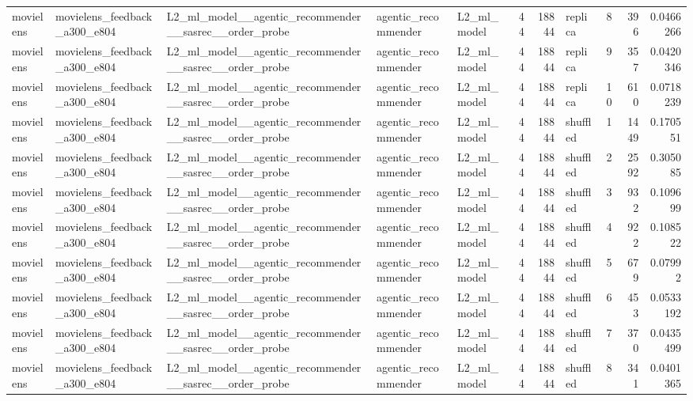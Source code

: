 \begin{table}[htbp!]
\begin{tabular}{lllllrrlrrr}
movielens & movielens\_feedback\_a300\_e804 & L2\_ml\_model\_\_agentic\_recommender\_\_sasrec\_\_order\_probe & agentic\_recommender & L2\_ml\_model & 44 & 18844 & replica & 8 & 396 & 0.0466266 \\
movielens & movielens\_feedback\_a300\_e804 & L2\_ml\_model\_\_agentic\_recommender\_\_sasrec\_\_order\_probe & agentic\_recommender & L2\_ml\_model & 44 & 18844 & replica & 9 & 357 & 0.0420346 \\
movielens & movielens\_feedback\_a300\_e804 & L2\_ml\_model\_\_agentic\_recommender\_\_sasrec\_\_order\_probe & agentic\_recommender & L2\_ml\_model & 44 & 18844 & replica & 10 & 610 & 0.0718239 \\
movielens & movielens\_feedback\_a300\_e804 & L2\_ml\_model\_\_agentic\_recommender\_\_sasrec\_\_order\_probe & agentic\_recommender & L2\_ml\_model & 44 & 18844 & shuffled & 1 & 1449 & 0.170551 \\
movielens & movielens\_feedback\_a300\_e804 & L2\_ml\_model\_\_agentic\_recommender\_\_sasrec\_\_order\_probe & agentic\_recommender & L2\_ml\_model & 44 & 18844 & shuffled & 2 & 2592 & 0.305085 \\
movielens & movielens\_feedback\_a300\_e804 & L2\_ml\_model\_\_agentic\_recommender\_\_sasrec\_\_order\_probe & agentic\_recommender & L2\_ml\_model & 44 & 18844 & shuffled & 3 & 932 & 0.109699 \\
movielens & movielens\_feedback\_a300\_e804 & L2\_ml\_model\_\_agentic\_recommender\_\_sasrec\_\_order\_probe & agentic\_recommender & L2\_ml\_model & 44 & 18844 & shuffled & 4 & 922 & 0.108522 \\
movielens & movielens\_feedback\_a300\_e804 & L2\_ml\_model\_\_agentic\_recommender\_\_sasrec\_\_order\_probe & agentic\_recommender & L2\_ml\_model & 44 & 18844 & shuffled & 5 & 679 & 0.07992 \\
movielens & movielens\_feedback\_a300\_e804 & L2\_ml\_model\_\_agentic\_recommender\_\_sasrec\_\_order\_probe & agentic\_recommender & L2\_ml\_model & 44 & 18844 & shuffled & 6 & 453 & 0.0533192 \\
movielens & movielens\_feedback\_a300\_e804 & L2\_ml\_model\_\_agentic\_recommender\_\_sasrec\_\_order\_probe & agentic\_recommender & L2\_ml\_model & 44 & 18844 & shuffled & 7 & 370 & 0.0435499 \\
movielens & movielens\_feedback\_a300\_e804 & L2\_ml\_model\_\_agentic\_recommender\_\_sasrec\_\_order\_probe & agentic\_recommender & L2\_ml\_model & 44 & 18844 & shuffled & 8 & 341 & 0.0401365 \\

\end{tabular}
\end{table}
